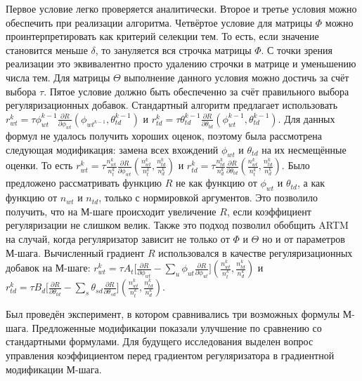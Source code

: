 \documentclass[12pt, twoside]{article}
\begin{document}
Первое условие легко проверяется аналитически. Второе и третье условия можно обеспечить при реализации алгоритма. Четвёртое условие для матрицы $\Phi$ можно проинтерпретировать как критерий селекции тем. То есть, если значение становится меньше $\delta$, то зануляется вся строчка матрицы $\Phi$. С точки зрения реализации это эквивалентно просто удалению строчки в матрице и уменьшению числа тем. Для матрицы $\Theta$ выполнение данного условия можно достичь за счёт выбора $\tau$. Пятое условие должно быть обеспеченно за счёт правильного выбора регуляризационных добавок. Стандартный алгоритм предлагает использовать $r_{wt}^{k} = \tau \phi_{wt}^{k-1} \frac{\partial{R}}{\partial{\phi_{wt}}}(\phi_{wt^{k-1}}, \theta_{td}^{k-1})$ и $r_{td}^{k}=\tau  \theta_{td}^{k-1} \frac{\partial{R}}{\partial{\theta_{td}}}(\phi_{wt}^{k-1}, \theta_{td}^{k-1})$. Для данных формул не удалось получить хороших оценок, поэтому была рассмотрена следующая модификация: замена всех вхождений $\phi_{wt}$ и $\theta_{td}$ на их несмещённые оценки. То есть  $r_{wt}^k= \tau \frac{n^k_{wt}}{n^k_t}\frac{\partial{R}}{\partial{\phi_{wt}}}\left(\frac{n^k_{wt}}{n^k_t}, \frac{n^k_{td}}{n^k_d}\right)$ и $r_{td}^k= \tau \frac{n^k_{td}}{n^k_d}\frac{\partial{R}}{\partial{\theta_{td}}}\left(\frac{n^k_{wt}}{n^k_t}, \frac{n^k_{td}}{n^k_d}\right)$. Было предложено рассматривать функцию $R$ не как функцию от $\phi_{wt}$ и $\theta_{td}$, а как функцию от $n_{wt}$ и $n_{td}$, только с нормировкой аргументов. Это позволило получить, что на М-шаге происходит увеличение $R$, если коэффициент регуляризации не слишком велик. Также это подход позволил обобщить ARTM на случай, когда регуляризатор зависит не только от $\Phi$  и $\Theta$ но и от параметров М-шага. Вычисленный градиент $R$ использовался  в качестве регуляризационных добавок на М-шаге: $r^k_{wt} = \tau A_t \bigl[{\frac{\partial{R}}{\partial{\phi_{wt}}} - \sum\limits_u \phi_{ut} \frac{\partial{R}}{\partial{\phi_{ut}}} }\bigr] \left(\frac{n^k_{wt}}{n^k_t}, \frac{n^k_{td}}{n^k_d}\right)$ и $r^k_{td} = \tau B_d \bigl[ {\frac{\partial{R}}{\partial{\theta_{td}}} - \sum\limits_s \theta_{sd} \frac{\partial{R}}{\partial{\theta_{sd}}} }\bigr] \left(\frac{n^k_{wt}}{n^k_t}, \frac{n^k_{td}}{n^k_d}\right)$.

Был проведён эксперимент, в котором сравнивались три возможных формулы М-шага. Предложенные модификации показали улучшение по сравнению со стандартными формулами. Для будущего исследования выделен вопрос управления коэффициентом перед градиентом регуляризатора в градиентной модификации М-шага.
\end{document}
